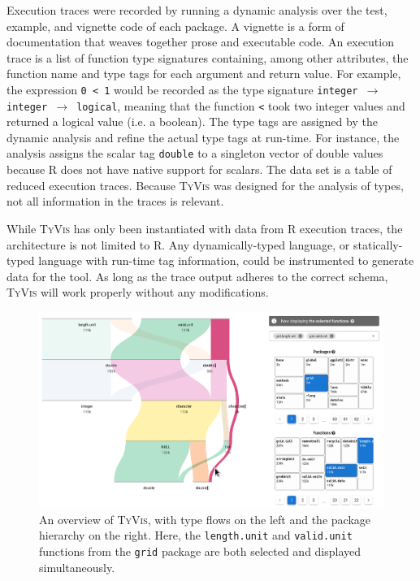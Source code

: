 \documentclass{vgtc}                          %
\newcommand{\ourmethodplaintext}{\textsc{TyVis}\xspace}
\newcommand{\ourmethod}{{\sc \ourmethodplaintext}\xspace}
\begin{document}
Execution traces were recorded by running a dynamic analysis over the test, example, and vignette code of each package.
A vignette is a form of documentation that weaves together prose and executable code.
An execution trace is a list of function type signatures containing, among other attributes, the function name and type tags for each argument and return value.
For example, the expression {\tt 0 < 1} would be recorded as the type signature {\tt integer $\to$ integer $\to$ logical}, meaning that the function {\tt <} took two integer values and returned a logical value (i.e. a boolean).
The type tags are assigned by the dynamic analysis and refine the actual type tags at run-time.
For instance, the analysis assigns the scalar tag {\tt double} to a singleton vector of double values because R does not have native support for scalars.
The data set is a table of reduced execution traces.
Because \ourmethod was designed for the analysis of types, not all information in the traces is relevant.

While \ourmethod has only been instantiated with data from R execution traces, the architecture is not limited to R.
Any dynamically-typed language, or statically-typed language with run-time tag information, could be instrumented to generate data for the tool.
As long as the trace output adheres to the correct schema, \ourmethod will work properly without any modifications.


\begin{figure}
 \centering
 \includegraphics[width=\linewidth]{img/typevis.png}
 \caption{An overview of \ourmethod, with type flows on the left and the package hierarchy on the right. Here, the {\tt length.unit} and {\tt valid.unit} functions from the {\tt grid} package are both selected and displayed simultaneously.}
 \label{fig:typevis}
\end{figure}
\end{document}
